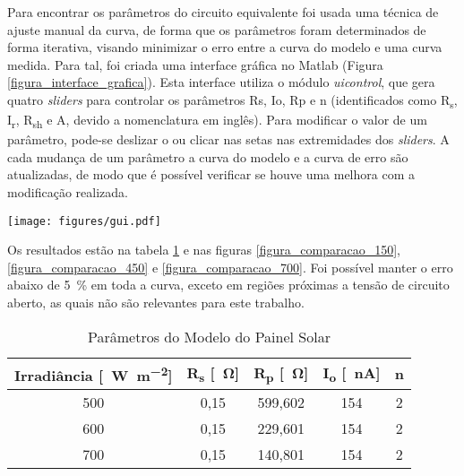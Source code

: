 Para encontrar os parâmetros do circuito equivalente foi usada uma técnica de ajuste manual da curva, de forma que os parâmetros foram determinados de forma iterativa, visando minimizar o erro entre a curva do modelo e uma curva medida. Para tal, foi criada uma interface gráfica no Matlab (Figura \ref{figura_interface_grafica}). Esta interface utiliza o módulo \textit{uicontrol}, que gera quatro \textit{sliders} para controlar os parâmetros \gls{Rs}, \gls{Io}, \gls{Rp} e \gls{n} (identificados como R\textsubscript{s}, I\textsubscript{r}, R\textsubscript{sh} e A, devido a nomenclatura em inglês). Para modificar o valor de um parâmetro, pode-se deslizar o ou clicar nas setas nas extremidades dos \textit{sliders}. A cada mudança de um parâmetro a curva do modelo e a curva de erro são atualizadas, de modo que é possível verificar se houve uma melhora com a modificação realizada.

\begin{sidewaysfigure}

\begin{center}
\texttt{[image: figures/gui.pdf]}
\caption{Interface Gráfica Para Ajuste da Curva}
\label{figura_interface_grafica}
\end{center}

\end{sidewaysfigure}

Os resultados estão na tabela \ref{parametros_modelo_painel_solar} e nas figuras \ref{figura_comparacao_150}, \ref{figura_comparacao_450} e \ref{figura_comparacao_700}. Foi possível manter o erro abaixo de \SI{5}{\percent} em toda a curva, exceto em regiões próximas a tensão de circuito aberto, as quais não são relevantes para este trabalho.

\begin{table}[!htpb]
\centering
\begin{tabular}{c c c c c}
\\ \hline
Irradiância [\SI{}{\watt\per\square\metre}] & R\textsubscript{s} [\SI{}{\ohm}] & R\textsubscript{p} [\SI{}{\ohm}] & I\textsubscript{o} [\SI{}{\nano\ampere}] & n \\ \hline \hline
500 & 0,15 & 599,602 & 154 & 2 \\
600 & 0,15 & 229,601 & 154 & 2 \\
700 & 0,15 & 140,801 & 154 & 2 \\ \hline
\end{tabular}
\caption{Parâmetros do Modelo do Painel Solar}
\label{parametros_modelo_painel_solar}
\end{table}

